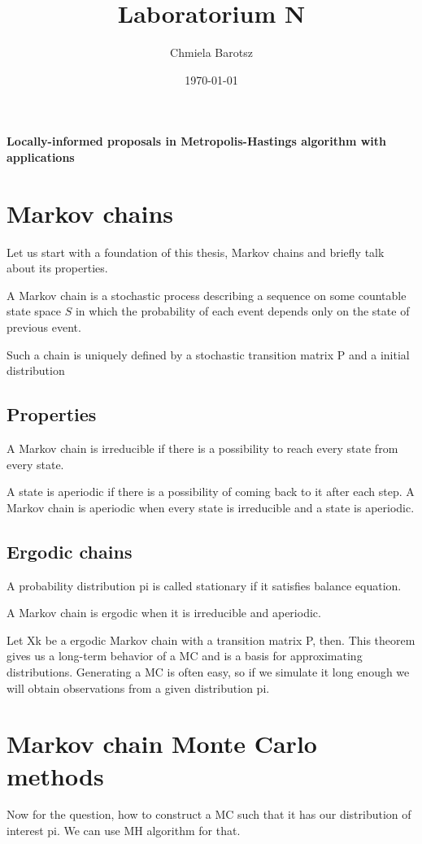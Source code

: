 \documentclass{article}
\title{Laboratorium N}
\author{Chmiela Barotsz}
\date{\today}
\begin{document}
	\begin{center}
		\textbf{\LARGE Locally-informed proposals in Metropolis-Hastings algorithm with applications}
	\end{center}

	\section{Markov chains}
		Let us start with a foundation of this thesis, Markov chains and briefly talk about its properties.
	
		A Markov chain is a stochastic process describing a sequence on some countable state space $S$ in which the probability of each event depends only on the state of previous event.
		
		Such a chain is uniquely defined by a stochastic transition matrix P and a initial distribution
	
		\subsection{Properties}
			A Markov chain is irreducible if there is a possibility to reach every state from every state.
			
			A state is aperiodic if there is a possibility of coming back to it after each step. A Markov chain is aperiodic when every state is irreducible and a state is aperiodic.
		
		\subsection{Ergodic chains}
			A probability distribution pi is called stationary if it satisfies balance equation.
			
			A Markov chain is ergodic when it is irreducible and aperiodic.
			
			Let Xk be a ergodic Markov chain with a transition matrix P, then. This theorem gives us a long-term behavior of a MC and is a basis for approximating distributions. Generating a MC is often easy, so if we simulate it long enough we will obtain observations from a given distribution pi.
			
	\section{Markov chain Monte Carlo methods}
		Now for the question, how to construct a MC such that it has our distribution of interest pi. We can use MH algorithm for that.
		
\end{document}
